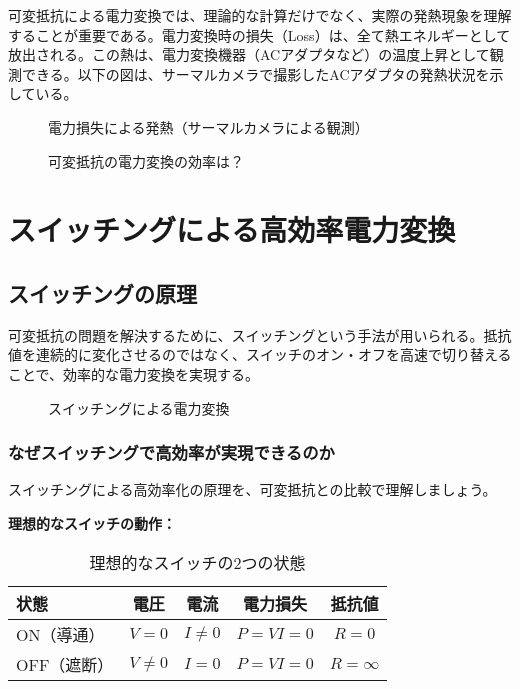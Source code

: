可変抵抗による電力変換では、理論的な計算だけでなく、実際の発熱現象を理解することが重要である。電力変換時の損失（Loss）は、全て熱エネルギーとして放出される。この熱は、電力変換機器（ACアダプタなど）の温度上昇として観測できる。以下の図は、サーマルカメラで撮影したACアダプタの発熱状況を示している。

\begin{figure}[H]
\centering
{}
\caption{電力損失による発熱（サーマルカメラによる観測）}
\label{fig:efficiency_calculation}
\end{figure}

\begin{figure}[H]
\centering
{}
\caption{可変抵抗の電力変換の効率は？}
\label{fig:resistor_efficiency}
\end{figure}

\section{スイッチングによる高効率電力変換}

\subsection{スイッチングの原理}

可変抵抗の問題を解決するために、スイッチングという手法が用いられる。抵抗値を連続的に変化させるのではなく、スイッチのオン・オフを高速で切り替えることで、効率的な電力変換を実現する。

\begin{figure}[H]
\centering
{}
\caption{スイッチングによる電力変換}
\label{fig:switching}
\end{figure}

\subsubsection{なぜスイッチングで高効率が実現できるのか}

スイッチングによる高効率化の原理を、可変抵抗との比較で理解しましょう。

\textbf{理想的なスイッチの動作：}

\begin{table}[H]
\centering
\caption{理想的なスイッチの2つの状態}
\begin{tabular}{|l|c|c|c|c|}
\hline
\textbf{状態} & \textbf{電圧} & \textbf{電流} & \textbf{電力損失} & \textbf{抵抗値} \\
\hline
\hline
ON（導通） & $V = 0$ & $I \neq 0$ & $P = VI = 0$ & $R = 0$ \\
\hline
OFF（遮断） & $V \neq 0$ & $I = 0$ & $P = VI = 0$ & $R = \infty$ \\
\hline
\end{tabular}
\end{table}

